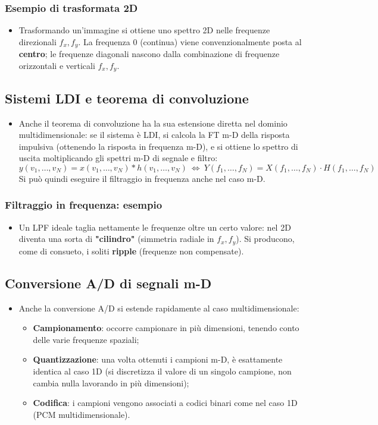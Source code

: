 \documentclass[12pt, a4paper]{article}
\begin{document}
\subsubsection{Esempio di trasformata 2D}
\begin{itemize}
    \item Trasformando un'immagine si ottiene uno spettro 2D nelle frequenze direzionali $f_x,f_y$. La frequenza $0$ (continua) viene convenzionalmente posta al \textbf{centro}; le frequenze diagonali nascono dalla combinazione di frequenze orizzontali e verticali $f_x,f_y$.
\end{itemize}

\subsection{Sistemi LDI e teorema di convoluzione}
\begin{itemize}
    \item Anche il teorema di convoluzione ha la sua estensione diretta nel dominio multidimensionale: se il sistema è LDI, si calcola la FT m-D della risposta impulsiva (ottenendo la risposta in frequenza m-D), e si ottiene lo spettro di uscita moltiplicando gli spettri m-D di segnale e filtro:
    $$y(v_1,\dots,v_N)=x(v_1,\dots,v_N)*h(v_1,\dots,v_N) \ \Longleftrightarrow\ Y(f_1,\dots,f_N)=X(f_1,\dots,f_N)\cdot H(f_1,\dots,f_N)$$
    Si può quindi eseguire il filtraggio in frequenza anche nel caso m-D.
\end{itemize}

\subsubsection{Filtraggio in frequenza: esempio}
\begin{itemize}
    \item Un LPF ideale taglia nettamente le frequenze oltre un certo valore: nel 2D diventa una sorta di \textbf{"cilindro"} (simmetria radiale in $f_x,f_y$). Si producono, come di consueto, i soliti \textbf{ripple} (frequenze non compensate).
\end{itemize}

\subsection{Conversione A/D di segnali m-D}
\begin{itemize}
    \item Anche la conversione A/D si estende rapidamente al caso multidimensionale:
    \begin{itemize}
        \item \textbf{Campionamento}: occorre campionare in più dimensioni, tenendo conto delle varie frequenze spaziali;
        \item \textbf{Quantizzazione}: una volta ottenuti i campioni m-D, è esattamente identica al caso 1D (si discretizza il valore di un singolo campione, non cambia nulla lavorando in più dimensioni);
        \item \textbf{Codifica}: i campioni vengono associati a codici binari come nel caso 1D (PCM multidimensionale).
    \end{itemize}
\end{itemize}
\end{document}
